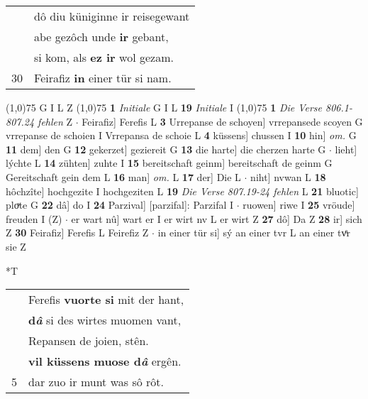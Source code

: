 \documentclass[8pt,a4paper,notitlepage]{article}
\begin{document}
\begin{table}[ht]
\begin{minipage}[t]{0.5\linewidth}
\begin{tabular}{rl}
 & dô diu küniginne ir reisegewant\\ 
 & abe gezôch unde \textbf{ir} gebant,\\ 
 & si kom, als \textbf{ez ir} wol gezam.\\ 
30 & Feirafiz \textbf{in} einer tür si nam.\\ 
\end{tabular}
\scriptsize
\line(1,0){75} \newline
G I L Z \newline
\line(1,0){75} \newline
\textbf{1} \textit{Initiale} G I L  \textbf{19} \textit{Initiale} I  \newline
\line(1,0){75} \newline
\textbf{1} \textit{Die Verse 806.1-807.24 fehlen} Z   $\cdot$ Feirafiz] Ferefis L \textbf{3} Urrepanse de schoyen] vrrepansede scoyen G vrrepanse de schoien I Vrrepansa de schoie L \textbf{4} küssens] chussen I \textbf{10} hin] \textit{om.} G \textbf{11} dem] den G \textbf{12} gekerzet] geziereit G \textbf{13} die harte] die cherzen harte G  $\cdot$ lieht] lýchte L \textbf{14} zühten] zuhte I \textbf{15} bereitschaft geinm] bereitschaft de geinm G Gereitschaft gein dem L \textbf{16} man] \textit{om.} L \textbf{17} der] Die L  $\cdot$ niht] nvwan L \textbf{18} hôchzîte] hochgezite I hochgeziten L \textbf{19} \textit{Die Verse 807.19-24 fehlen} L  \textbf{21} bluotic] ploͮte G \textbf{22} dâ] do I \textbf{24} Parzival] [parzifal]: Parzifal I  $\cdot$ ruowen] riwe I \textbf{25} vröude] freuden I (Z)  $\cdot$ er wart nû] wart er I er wirt nv L er wirt Z \textbf{27} dô] Da Z \textbf{28} ir] sich Z \textbf{30} Feirafiz] Ferefis L Feirefiz Z  $\cdot$ in einer tür si] sý an einer tvr L an einer tvͤr sie Z \newline
\end{minipage}
\hspace{0.5cm}
\begin{minipage}[t]{0.5\linewidth}
\small
\begin{center}*T
\end{center}
\begin{tabular}{rl}
 & Ferefis \textbf{vuorte si} mit der hant,\\ 
 & \textbf{d\textit{â}} si des wirtes muomen vant,\\ 
 & Repansen de joien, stên.\\ 
 & \textbf{vil küssens muose d\textit{â}} ergên.\\ 
5 & dar zuo ir munt was sô rôt.\\ 

\end{tabular}
\end{minipage}
\end{table}
\end{document}
